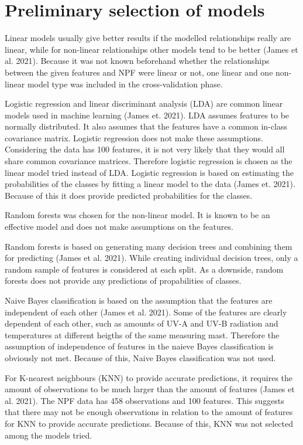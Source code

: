 \documentclass[a4size, 12pt]{report}
\begin{document}
	
	\section*{Preliminary selection of models}
	
	Linear models usually give better results if the modelled relationships really are linear, while for non-linear relationships other models tend to be better (James et al. 2021). Because it was not known beforehand whether the relationships between the given features and NPF were linear or not, one linear and one non-linear model type was included in the cross-validation phase.  
	
	Logistic regression and linear discriminant analysis (LDA) are common linear models used in machine learning  (James et. 2021). LDA assumes features to be normally distributed. It also assumes that the features have a common in-class covariance matrix. Logistic regression does not make these assumptions. Considering the data has 100 features, it is not very likely that they would all share common covariance matrices. Therefore logistic regression is chosen as the linear model tried instead of LDA. Logistic regression is based on estimating the probabilities of the classes by fitting a linear model to the data  (James et. 2021). Because of this it does provide predicted probabilities for the classes.  
	  
	Random forests was chosen for the non-linear model. It is known to be an effective model and does not make assumptions on the features. 
	
	Random forests is based on generating many decision trees and combining them for predicting (James et al. 2021). While creating individual decision trees, only a random sample of features is considered at each split. As a downside, random forests does not provide any predictions of propabilities of classes. 
	
	Naive Bayes classification is based on the assumption that the features are independent of each other (James et al. 2021). Some of the features are clearly dependent of each  other, such as amounts of UV-A and UV-B radiation and temperatures at different heigths of the same measuring mast. Therefore the assumption of independence of features in the naieve Bayes classification is obviously not met. Because of this, Naive Bayes classification was not used. 
	
	For K-nearest neighbours (KNN) to provide accurate predictions, it requires the amount of observations to be much larger than the amount of features (James et al. 2021). The NPF data has 458 observations and 100 features. This suggests that there may not be enough observations in relation to the amount of features for KNN to provide accurate predictions. Because of this, KNN was not selected among the models tried.   
\end{document}
